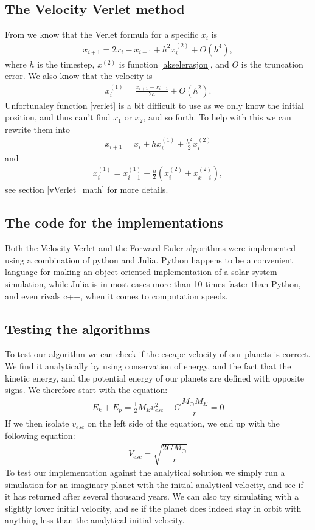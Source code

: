 \documentclass[a4paper]{article}
\begin{document}
\subsection{The Velocity Verlet method}
From \cite{lecture notes} we know that the Verlet formula for a specific $x_i$ is
\begin{align}
x_{i+1} = 2x_i - x_{i-1} + h^2 x_i^{(2)} + O(h^4) \label{verlet},
\end{align}
where $h$ is the timestep, $x^{(2)}$ is function \ref{akselerasjon}, and $O$ is the truncation error. We also know that the velocity is
\begin{align}
x_i^{(1)} = \frac{x_{i+1} - x_{i-1}}{2h} + O(h^2). \label{vVerlet}
\end{align}
Unfortunaley function \ref{verlet} is a bit difficult to use as we only know the initial position, and thus can't find $x_1$ or $x_2$, and so forth. To help with this we can rewrite them into
\begin{align}
x_{i+1} = x_i + hx_i^{(1)} + \frac{h^2}{2}x_i^{(2)} \label{velVerlet}
\end{align}
and
\begin{align}
x_i^{(1)} = x_{i-1}^{(1)} + \frac{h}{2} \left( x_i^{(2)} + x_{x-i}^{(2)} \right) \label{VvelVerlet},
\end{align}
see section \ref{vVerlet_math} for more details.


\subsection{The code for the implementations}
Both the Velocity Verlet and the Forward Euler algorithms were implemented using a combination of python and Julia. Python happens to be a convenient language for making an object oriented implementation of a solar system simulation, while Julia is in most cases more than 10 times faster than Python, and even rivals c++, when it comes to computation speeds.


\subsection{Testing the algorithms}
To test our algorithm we can check if the escape velocity of our planets is correct. We find it analytically by using conservation of energy, and the fact that the kinetic energy, and the potential energy of our planets are defined with opposite signs. We therefore start with the equation:
\begin{align*}
E_k + E_p = \tfrac{1}{2}M_{E}v_{esc}^{2} - G\dfrac{M_{\odot}M_{E}}{r} = 0
\end{align*}
If we then isolate $v_{esc}$ on the left side of the equation, we end up with the following equation: 
\begin{align}
V_{esc} = \sqrt{\dfrac{2GM_{\odot}}{r}}
\end{align}
To test our implementation against the analytical solution we simply run a simulation for an imaginary planet with the initial analytical velocity, and see if it has returned after several thousand years. We can also try simulating with a slightly lower initial velocity, and se if the planet does indeed stay in orbit with anything less than the analytical initial velocity.
\end{document}
